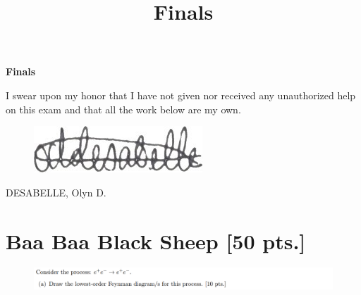 \documentclass[11pt]{article}
\theoremstyle{definition}
\numberwithin{equation}{section}
\begin{document}
\title{Finals}

\pagestyle{fancy}
\fancyhf{}

\begin{center}
{\LARGE \bf Finals}\\
\end{center}

\begin{mdframed}
    I swear upon my honor that I have not given nor received any unauthorized help on this exam and that all the work below are my own.
\end{mdframed}
\begin{figure}[H]
    \includegraphics[scale = 20]{my e-sig.jpg}
\end{figure}

DESABELLE, Olyn D.

\noindent\makebox[\linewidth]{\rule{\paperwidth}{0.4pt}}

\section{\textbf{Baa Baa Black Sheep} [50 pts.]}

\begin{figure}[H]
    \centering
    \includegraphics[scale = 0.4]{1a.png}
\end{figure}


\end{document}

